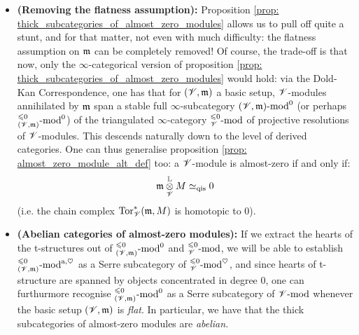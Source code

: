                     \begin{remark} \label{remark: almost_zero_modules_over_non_flat_basic_setups}
                        \noindent
                        \begin{itemize}
                            \item \textbf{(Removing the flatness assumption):} Proposition \ref{prop: thick_subcategories_of_almost_zero_modules} allows us to pull off quite a stunt, and for that matter, not even with much difficulty: the flatness assumption on $\mathfrak{m}$ can be completely removed! Of course, the trade-off is that now, only the $\infty$-categorical version of proposition \ref{prop: thick_subcategories_of_almost_zero_modules} would hold: via the Dold-Kan Correspondence, one has that for $(\mathscr{V}, \mathfrak{m})$ a basic setup, $\mathscr{V}$-modules annihilated by $\mathfrak{m}$ span a stable full $\infty$-subcategory $(\mathscr{V}, \mathfrak{m})\text{-}\mathrm{mod}^0$ (or perhaps ${}^{\leqslant 0}_{(\mathscr{V}, \mathfrak{m})}\text{-}\mathrm{mod}^0$) of the triangulated $\infty$-category ${}^{\leqslant 0}_{\mathscr{V}}\text{-}\mathrm{mod}$ of projective resolutions of $\mathscr{V}$-modules. This descends naturally down to the level of derived categories. One can thus generalise proposition \ref{prop: almost_zero_module_alt_def} too: a $\mathscr{V}$-module is almost-zero if and only if:
                                $$\m \tensor_{\scrV}^{\L} M \cong_{\qis} 0$$
                            (i.e. the chain complex $\mathrm{Tor}_{\mathscr{V}}^*(\mathfrak{m}, M)$ is homotopic to $0$).
                            \item \textbf{(Abelian categories of almost-zero modules):} If we extract the hearts of the t-structures out of ${}^{\leqslant 0}_{(\mathscr{V}, \mathfrak{m})}\text{-}\mathrm{mod}^0$ and ${}^{\leqslant 0}_{\mathscr{V}}\text{-}\mathrm{mod}$, we will be able to establish ${}^{\leqslant 0}_{(\mathscr{V}, \mathfrak{m})}\text{-}\mathrm{mod}^{\mathrm{a}, \heartsuit}$ as a Serre subcategory of ${}^{\leqslant 0}_{\mathscr{V}}\text{-}\mathrm{mod}^{\heartsuit}$, and since hearts of t-structure are spanned by objects concentrated in degree $0$, one can furthurmore recognise ${}^{\leqslant 0}_{(\mathscr{V}, \mathfrak{m})}\text{-}\mathrm{mod}^0$ as a Serre subcategory of $\mathscr{V}\text{-}\mathrm{mod}$ whenever the basic setup $(\mathscr{V}, \mathfrak{m})$ is \textit{flat}. In particular, we have that the thick subcategories of almost-zero modules are \textit{abelian}.
                        \end{itemize}
                    \end{remark}
                    
